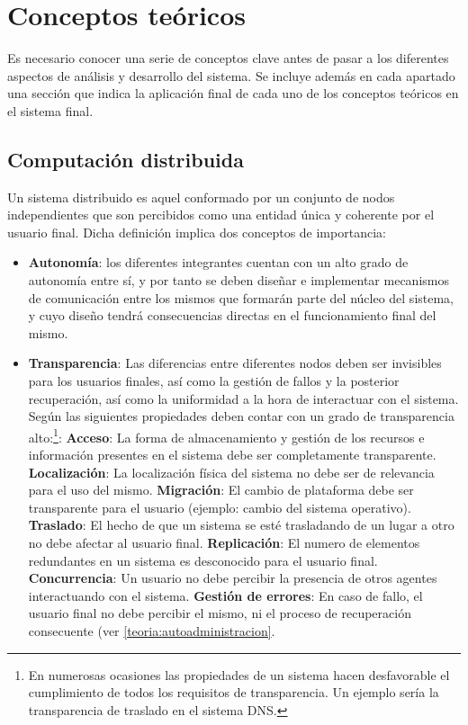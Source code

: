 \chapter{Conceptos teóricos}

Es necesario conocer una serie de conceptos clave antes de pasar a los diferentes aspectos de análisis y desarrollo del sistema. Se incluye además en cada apartado una sección que indica la aplicación final de cada uno de los conceptos teóricos en el sistema final.

\section{Computación distribuida}

Un sistema distribuido es aquel conformado por un conjunto de nodos independientes que son percibidos como una entidad única y coherente por el usuario final. Dicha definición implica dos conceptos de importancia:

\begin{itemize}
  \item \textbf{Autonomía}: los diferentes integrantes cuentan con un alto grado de autonomía entre sí, y por tanto se deben diseñar e implementar mecanismos de comunicación entre los mismos que formarán parte del núcleo del sistema, y cuyo diseño tendrá consecuencias directas en el funcionamiento final del mismo.
  \item \textbf{Transparencia}: Las diferencias entre diferentes nodos deben ser invisibles para los usuarios finales, así como la gestión de fallos y la posterior recuperación, así como la uniformidad a la hora de interactuar con el sistema. Según \cite{Tanenbaum:2006:DSP:1202502:Ch1} las siguientes propiedades deben contar con un grado de transparencia alto:\footnote{En numerosas ocasiones las propiedades de un sistema hacen desfavorable el cumplimiento de todos los requisitos de transparencia. Un ejemplo sería la transparencia de traslado en el sistema DNS.}:
\label{transparencia}
  \subitem \textbf{Acceso}: La forma de almacenamiento y gestión de los recursos e información presentes en el sistema debe ser completamente transparente.
  \subitem \textbf{Localización}: La localización física del sistema no debe ser de relevancia para el uso del mismo.
  \subitem \textbf{Migración}: El cambio de plataforma debe ser transparente para el usuario (ejemplo: cambio del sistema operativo).
  \subitem \textbf{Traslado}: El hecho de que un sistema se esté trasladando de un lugar a otro no debe afectar al usuario final.
  \subitem \textbf{Replicación}: El numero de elementos redundantes en un sistema es desconocido para el usuario final.
  \subitem \textbf{Concurrencia}: Un usuario no debe percibir la presencia de otros agentes interactuando con el sistema.
  \subitem \textbf{Gestión de errores}: En caso de fallo, el usuario final no debe percibir el mismo, ni el proceso de recuperación consecuente (ver \ref{teoria:autoadministracion}.
\end{itemize}

